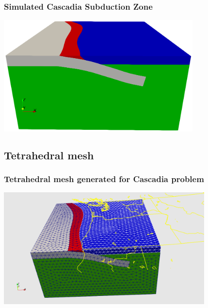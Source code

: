 \documentclass{beamer}
\begin{document}
\begin{frame}
  \frametitle{Simulated Cascadia Subduction Zone}
 
  \vfill
  \begin{center}
    \includegraphics[height=6.1cm]{figs/subduction3d_conceptualmodel}
  \end{center}
  \vfill

\end{frame}


\subsection{Tetrahedral mesh}

\begin{frame}
  \frametitle{Tetrahedral mesh generated for Cascadia problem}
 
  \vfill
  \begin{center}
    \includegraphics[height=6.1cm]{figs/subduction3d_tetmesh}
  \end{center}
  \vfill
 
\end{frame}
\end{document}
